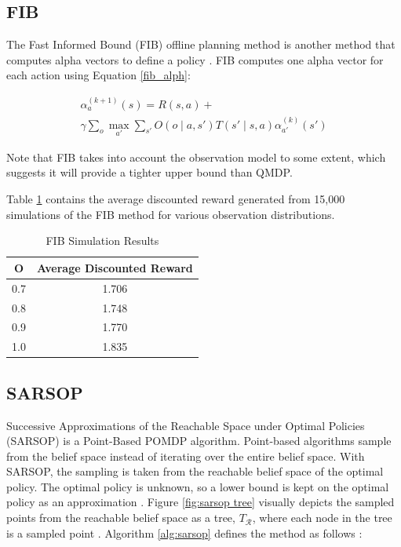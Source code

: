 \documentclass{article}
\begin{document}
\subsection*{FIB}

The Fast Informed Bound (FIB) offline planning method is another method that computes alpha vectors to define a policy \cite[21.2]{228 Book}.  FIB computes one alpha vector for each action using Equation \ref{fib_alph}:

\begin{multline}\label{fib_alph}
    \alpha_{a}^{(k+1)}(s) = R(s,a) + \\ \gamma\sum_{o}\max_{a'}\sum_{s'}O(o \mid a,s')T(s' \mid s,a)\alpha_{a'}^{(k)}(s')
    \end{multline}

Note that FIB takes into account the observation model to some extent, which suggests it will provide a tighter upper bound than QMDP.

Table \ref{tab:fib} contains the average discounted reward generated from 15,000 simulations of the FIB method for various observation distributions.

\begin{table}[h]
\centering
\caption{FIB Simulation Results}
\label{tab:fib}
\begin{tabular}{|c|c|}
\hline
O & Average Discounted Reward  \\ \hline
0.7 & 1.706 \\ \hline
0.8 & 1.748 \\ \hline
0.9 & 1.770 \\ \hline
1.0 & 1.835 \\ \hline
\end{tabular}
\end{table}

\subsection*{SARSOP}

Successive Approximations of the Reachable Space under Optimal Policies (SARSOP) is a Point-Based POMDP algorithm.  Point-based algorithms sample from the belief space instead of iterating over the entire belief space.  With SARSOP, the sampling is taken from the reachable belief space of the optimal policy. The optimal policy is unknown, so a lower bound is kept on the optimal policy as an approximation \cite{SARSOP}.  Figure \ref{fig:sarsop tree} visually depicts the sampled points from the reachable belief space as a tree, $T_{\mathcal{R}}$, where each node in the tree is a sampled point \cite{SARSOP}.  Algorithm \ref{alg:sarsop} defines the method as follows \cite{SARSOP}:
\end{document}
